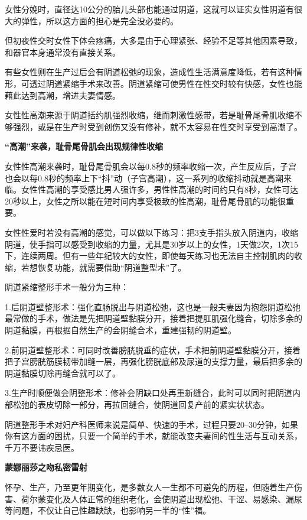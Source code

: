 \documentclass[12pt,UTF8]{ctexbook}
\begin{document}
女性分娩时，直径达10公分的胎儿头部也能通过阴道，这就可以证实女性阴道有很大的弹性，所以这方面的担心是完全没必要的。

但初夜性交时女性下体会疼痛，大多是由于心理紧张、经验不足等其他因素导致，和器官本身通常没有直接关系。

有些女性则在生产过后会有阴道松弛的现象，造成性生活满意度降低，若有这种情形，可透过阴道紧缩手术来改善。阴道紧缩可使男性在性交时较有快感，女性也能藉此达到高潮，增进夫妻情感。

女性性高潮来源于阴道括约肌强烈收缩，继而刺激性感带，若是耻骨尾骨肌收缩不够强烈，或是在生产时受到创伤又没有修补，就不太容易在性交时享受到高潮了。

\textbf{“高潮”来袭，耻骨尾骨肌会出现规律性收缩}

女性性高潮来袭时，耻骨尾骨肌会以每0.8秒的频率收缩一次，产生反应后，子宫也会以每0.8秒的频率上下“抖”动（子宫高潮），这一系列的收缩抖动就是高潮来临。女性性高潮的享受感比男人强许多，男性性高潮的时间约只有8秒，女性可达20秒以上，女性之所以能在短时间内享受极致的性高潮，耻骨尾骨肌的功能很重要。

女性性爱时若没有高潮的感觉，可以做以下练习：把3支手指头放入阴道内，收缩阴道，使手指可以感受到收缩的力量，尤其是30岁以上的女性，1天做2次，1次15下，连续两周。但有一些年纪较大的女性，即使每天练习也无法自主控制肌肉的收缩，若想恢复功能，就需要借助“阴道整型术”了。

阴道紧缩整形手术一般分为三种：

1.后阴道壁整形术：强化直肠脱出与阴道松弛，这也是一般夫妻因为抱怨阴道松弛最常做的手术，做法是先把阴道壁黏膜分开，接着把提肛肌强化缝合，切除多余的阴道黏膜，再根据自然生产的会阴缝合术，重建强韧的阴道壁。

2.前阴道壁整形术：可同时改善膀胱脱垂的症状，手术把前阴道壁黏膜分开，接着把子宫膀胱筋膜韧带加缝一层，再强化膀胱底部及尿道的支撑力量，最后把多余的阴道黏膜切除再缝合就可以了。

3.生产时顺便做会阴整形术：修补会阴缺口处再重新缝合，此时可以同时把阴道内部松弛的表皮切除一部分，再拉回缝合，使阴道回复产前的紧实状状态。

阴道整形手术对妇产科医师来说是简单、快速的手术，过程只要20--30分钟，如果你有这方面的困扰，只要一个简单的手术，就能改变夫妻间的性生活与互动关系，千万不要讳疾忌医。

\textbf{蒙娜丽莎之吻私密雷射}

怀孕、生产，乃至更年期变化，是多数女人一生都不可避免的历程，但随着生产伤害、荷尔蒙变化及人体正常的组织老化，会使阴道出现松弛、干涩、易感染、漏尿等问题，不仅让自己性趣缺缺，也影响另一半的“性”福。
\end{document}
